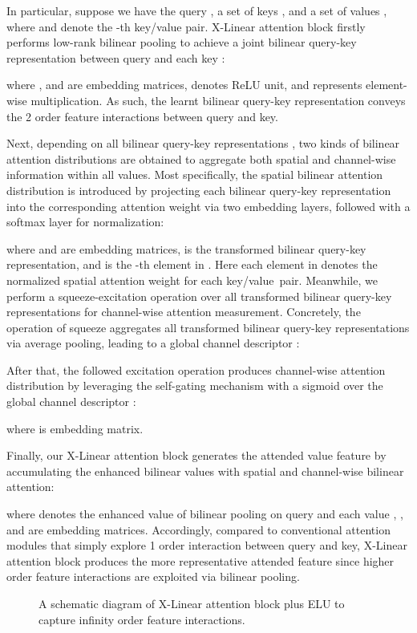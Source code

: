 \documentclass[10pt,twocolumn,letterpaper]{article}
\begin{document}
In particular, suppose we have the query , a set of keys , and a set of values , where  and  denote the -th key/value pair. X-Linear attention block firstly performs low-rank bilinear pooling to achieve a joint bilinear query-key representation  between query  and each key :

where , and  are embedding matrices,  denotes ReLU unit, and  represents element-wise multiplication. As such, the learnt bilinear query-key representation  conveys the 2 order feature interactions between query and key.

Next, depending on all bilinear query-key representations , two kinds of bilinear attention distributions are obtained to aggregate both spatial and channel-wise information within all values. Most specifically, the spatial bilinear attention distribution is introduced by projecting each bilinear query-key representation into the corresponding attention weight via two embedding layers, followed with a softmax layer for normalization:

where  and  are embedding matrices,  is the transformed bilinear query-key representation, and  is the -th element in . Here each element  in  denotes the normalized spatial attention weight for each key/value~pair. Meanwhile, we perform a squeeze-excitation operation \cite{hu2018squeeze} over all transformed bilinear query-key representations  for channel-wise attention measurement. Concretely, the operation of squeeze aggregates all transformed bilinear query-key representations via average pooling, leading to a global channel descriptor :

After that, the followed excitation operation produces channel-wise attention distribution  by leveraging the self-gating mechanism with a sigmoid over the global channel descriptor :

where  is embedding matrix.

Finally, our X-Linear attention block generates the attended value feature  by accumulating the enhanced bilinear values with spatial and channel-wise bilinear attention:

where  denotes the enhanced value of bilinear pooling on query  and each value , , and  are embedding matrices. Accordingly, compared to conventional attention modules that simply explore 1 order interaction between query and key, X-Linear attention block produces the more representative attended feature since higher order feature interactions are exploited via bilinear pooling.


\begin{figure}[!tb]
    \vspace{-0.1in}
    \caption{ A schematic diagram of X-Linear attention block plus ELU to capture infinity order feature interactions.}
    \label{fig:architecture}
    \vspace{-0.2in}
\end{figure}
\end{document}
